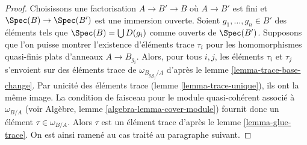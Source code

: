 \begin{proof}
Choisissons une factorisation $A \to B' \to B$ où $A \to B'$ est fini et
$\Spec(B) \to \Spec(B')$ est une immersion ouverte. Soient $g_1, \ldots, g_n \in B'$
des éléments tels que $\Spec(B) = \bigcup D(g_i)$ comme ouverts de $\Spec(B')$.
Supposons que l'on puisse montrer l'existence d'éléments trace $\tau_i$ pour les
homomorphismes quasi-finis plats d'anneaux $A \to B_{g_i}$. Alors, pour tous $i, j$, les éléments
$\tau_i$ et $\tau_j$ s'envoient sur des éléments trace de $\omega_{B_{g_ig_j}/A}$
d'après le lemme \ref{lemma-trace-base-change}. Par unicité des
éléments trace (lemme \ref{lemma-trace-unique}), ils ont la même image.
La condition de faisceau pour le module quasi-cohérent associé à
$\omega_{B/A}$ (voir Algèbre, lemme \ref{algebra-lemma-cover-module})
fournit donc un élément $\tau \in \omega_{B/A}$.
Alors $\tau$ est un élément trace d'après le
lemme \ref{lemma-glue-trace}.
On est ainsi ramené au cas traité au paragraphe suivant.


\end{proof}
